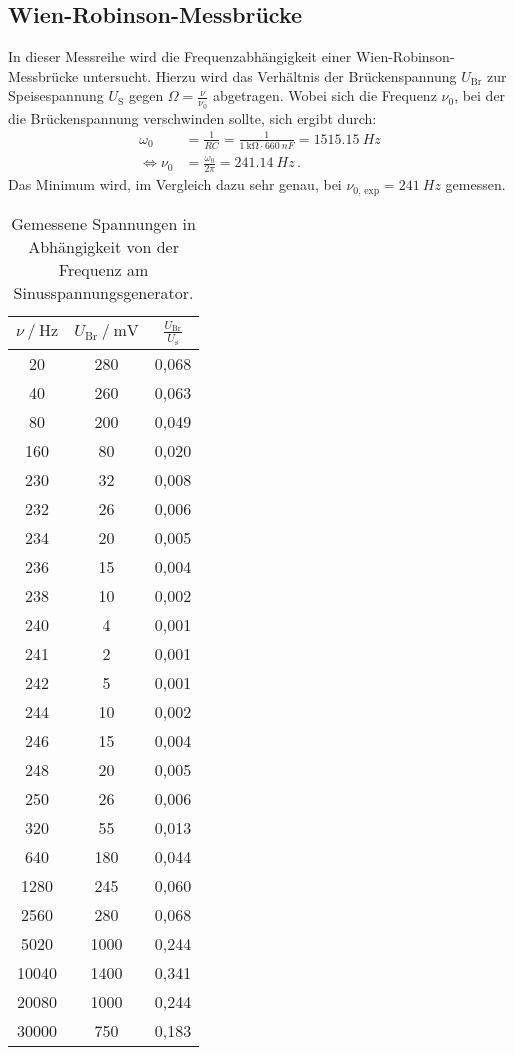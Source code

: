 \subsection{Wien-Robinson-Messbrücke} \label{sec:wienausw}

In dieser Messreihe wird die Frequenzabhängigkeit einer Wien-Robinson-Messbrücke untersucht.
Hierzu wird das Verhältnis der Brückenspannung $U_\text{Br}$ zur Speisespannung $U_\text{S}$
gegen $\Omega = \frac{\nu}{\nu_0}$ abgetragen. Wobei sich die Frequenz $\nu_0$, 
bei der die Brückenspannung verschwinden sollte, sich ergibt durch:
\begin{align*}
  \omega_{0} &=\frac{1}{R C}=\frac{1}{\qty{1}{\kilo\ohm} \cdot \qty{660}{nF}}= \qty{1515.15}{Hz} \\
  \Leftrightarrow \nu_{0} &=\frac{\omega_{0}}{2 \pi} = \qty{241.14}{Hz} \, .
\end{align*}
Das Minimum wird, im Vergleich dazu sehr genau, bei $\nu_\text{0, exp} = \qty{241}{Hz}$ gemessen.

\begin{table}
  \centering
  \caption{Gemessene Spannungen in Abhängigkeit von der Frequenz am Sinusspannungsgenerator.}
  \label{tab:spannung}
  \begin{tabular}{c c c}
    \toprule
    $\nu \mathbin{/} \mathrm{Hz}$ &  $U_\text{Br} \mathbin{/} \mathrm{mV}$ & $\frac{U_\text{Br}}{U_\text{s}}$ \\
    \midrule
        20 &     280 & 0,068 \\
        40 &     260 & 0,063 \\
        80 &     200 & 0,049 \\
       160 &      80 & 0,020 \\
       230 &      32 & 0,008 \\
       232 &      26 & 0,006 \\
       234 &      20 & 0,005 \\
       236 &      15 & 0,004 \\
       238 &      10 & 0,002 \\
       240 &       4 & 0,001 \\
       241 &       2 & 0,001 \\
       242 &       5 & 0,001 \\
       244 &      10 & 0,002 \\
       246 &      15 & 0,004 \\
       248 &      20 & 0,005 \\
       250 &      26 & 0,006 \\
       320 &      55 & 0,013 \\
       640 &     180 & 0,044 \\
      1280 &     245 & 0,060 \\
      2560 &     280 & 0,068 \\
      5020 &    1000 & 0,244 \\
     10040 &    1400 & 0,341 \\
     20080 &    1000 & 0,244 \\
     30000 &     750 & 0,183 \\  
    \bottomrule
    \end{tabular}
\end{table}

